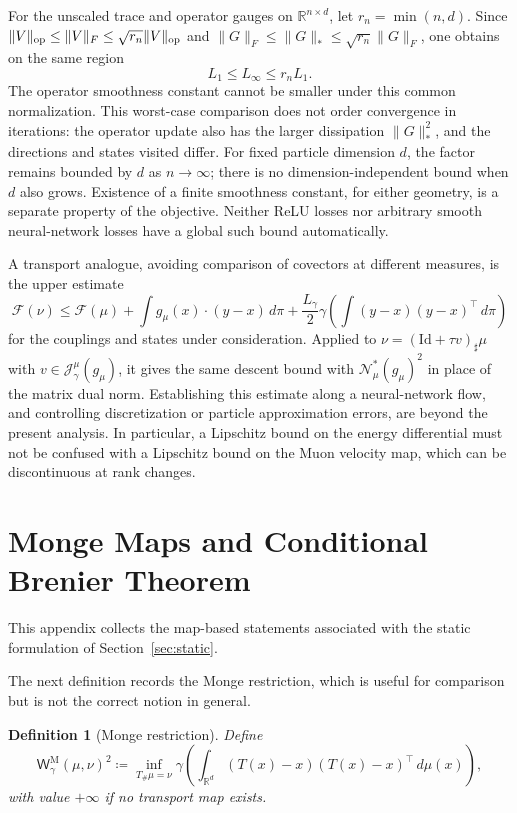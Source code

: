 \documentclass{article}
\newtheorem{definition}[theorem]{Definition}
\newcommand{\R}{\mathbb{R}}
\newcommand{\MF}{\mathcal{F}}
\newcommand{\MN}{\mathcal{N}}
\newcommand{\MJ}{\mathcal{J}}
\newcommand{\WgM}{\mathsf{W}_{\gamma}^{\mathrm{M}}}
\newcommand{\Id}{\mathrm{Id}}
\begin{document}
For the unscaled trace and operator gauges on $\R^{n\times d}$, let
$r_n=\min(n,d)$. Since
$\|V\|_{\rm op}\le\|V\|_F\le\sqrt{r_n}\|V\|_{\rm op}$ and
$\|G\|_F\le\|G\|_*\le\sqrt{r_n}\|G\|_F$, one obtains on the same region
\[
 L_1\le L_\infty\le r_nL_1.
\]
The operator smoothness constant cannot be smaller under this common
normalization. This worst-case comparison does not order convergence in
iterations: the operator update also has the larger dissipation
$\|G\|_*^2$, and the directions and states visited differ.
For fixed particle dimension $d$, the factor remains bounded by $d$ as
$n\to\infty$; there is no dimension-independent bound when $d$ also grows.
Existence of a finite smoothness constant, for either geometry, is a
separate property of the objective. Neither ReLU losses nor arbitrary
smooth neural-network losses have a global such bound automatically.

A transport analogue, avoiding comparison of covectors at different
measures, is the upper estimate
\[
 \MF(\nu)\le\MF(\mu)+\int g_\mu(x)\cdot(y-x)\,d\pi
 +\frac{L_\gamma}{2}\gamma\!\left(\int(y-x)(y-x)^\top\,d\pi\right)
\]
for the couplings and states under consideration. Applied to
$\nu=(\Id+\tau v)_\sharp\mu$ with
$v\in\MJ_\gamma^\mu(g_\mu)$, it gives the same descent bound with
$\MN_\mu^*(g_\mu)^2$ in place of the matrix dual norm. Establishing this
estimate along a neural-network flow, and controlling discretization or
particle approximation errors, are beyond the present analysis. In
particular, a Lipschitz bound on the energy differential must not be
confused with a Lipschitz bound on the Muon velocity map, which can be
discontinuous at rank changes.

\section{Monge Maps and Conditional Brenier Theorem}
\label{app:monge}
This appendix collects the map-based statements associated with the static formulation of Section~\ref{sec:static}.

The next definition records the Monge restriction, which is useful for comparison but is not the correct notion in general.
\begin{definition}[Monge restriction]
\label{def:monge}
Define
$$
\WgM(\mu,\nu)^2
\coloneqq 
\inf_{T_\#\mu=\nu}
\gamma\!\left(
\int_{\R^d}(T(x)-x)(T(x)-x)^\top\,d\mu(x)
\right),
$$
with value $+\infty$ if no transport map exists.
\end{definition}
\end{document}
